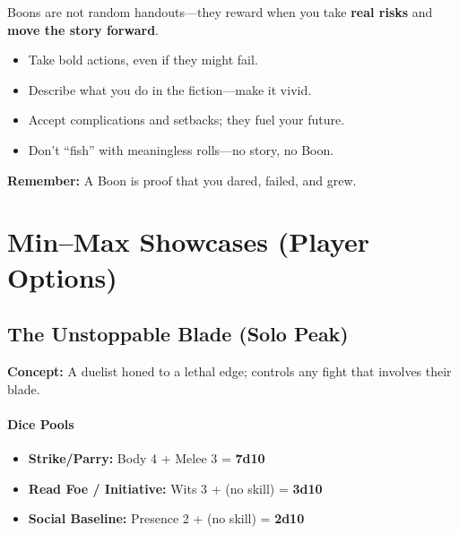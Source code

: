 \documentclass[11pt]{book}
\begin{document}
\begin{tcolorbox}[title=Player Tip: How to Earn Boons,colback=black!2,colframe=black!40!white]
  Boons are not random handouts—they reward when you take \textbf{real risks} and \textbf{move the story forward}.  
  
  \begin{itemize}
    \item Take bold actions, even if they might fail.  
    \item Describe what you do in the fiction—make it vivid.  
    \item Accept complications and setbacks; they fuel your future.  
    \item Don’t “fish” with meaningless rolls—no story, no Boon.  
  \end{itemize}
  
  \textbf{Remember:} A Boon is proof that you dared, failed, and grew.
  \end{tcolorbox}

\section*{Min–Max Showcases (Player Options)}

\subsection*{The Unstoppable Blade (Solo Peak)}
\textbf{Concept:} A duelist honed to a lethal edge; controls any fight that involves their blade.

\paragraph{Dice Pools}
\begin{itemize}
  \item \textbf{Strike/Parry:} Body 4 + Melee 3 = \textbf{7d10}
  \item \textbf{Read Foe / Initiative:} Wits 3 + (no skill) = \textbf{3d10}
  \item \textbf{Social Baseline:} Presence 2 + (no skill) = \textbf{2d10}
\end{itemize}
\end{document}
